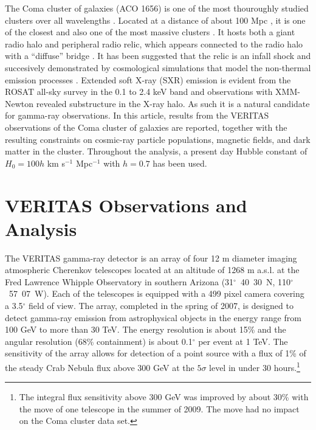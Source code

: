 \documentclass[12pt,manuscript]{aastex}
\begin{document}
The Coma cluster of galaxies (ACO 1656) is one of the most thouroughly studied clusters over all wavelengths \citep{article:Voges_etal:1999}. Located at a distance of about 100 Mpc \citep[$z=0.023$;][]{article:StrubleRood:1999}, it is one of the closest and also one of the most massive clusters \citep[$M \sim 10^{15}M_{\odot}$;][]{article:Smith:1983, article:Kubo_etal:2008}. It hosts both a giant radio halo \citep{article:Giovannini_etal:1993,article:Thierbach_etal:2003} and peripheral radio relic, which appears connected to the radio halo with a ``diffuse'' bridge \citep[see discussion in][]{article:BrownRudnick:2010}. It has been suggested that the relic is an infall shock \citep{article:Ensslin_etal:1998} and succesively demonstrated by cosmological simulations that model the non-thermal emission processes \citep{article:PfrommerEnsslinSpringel:2008, article:Pfrommer:2008, article:Battaglia_etal:2009, article:Skillman_etal:2011}. Extended soft X-ray (SXR) emission is evident from the ROSAT all-sky survey in the 0.1 to 2.4 keV band \citep{article:BrielHenryBohringer:1992} and observations with XMM-Newton \citep{article:Briel_etal:2001} revealed substructure in the X-ray halo. As such it is a natural candidate for gamma-ray observations. In this article, results from the VERITAS observations of the Coma cluster of galaxies are reported, together with the resulting constraints on cosmic-ray particle populations, magnetic fields, and dark matter in the cluster. Throughout the analysis, a present day Hubble constant of $H_{0} = 100h$ km s$^{-1}$ Mpc$^{-1}$ with $h=0.7$ has been used.

\section{VERITAS Observations and Analysis}
The VERITAS gamma-ray detector \citep{article:Weekes_etal:2002} is an array of four 12 m diameter imaging atmospheric Cherenkov telescopes \citep[IACTs;][]{article:Holder_etal:2006} located at an altitude of 1268 m a.s.l. at the Fred Lawrence Whipple Observatory in southern Arizona (31$^{\circ}$~40\arcmin~30\arcsec~N, 110$^{\circ}$~57\arcmin~07\arcsec~W). Each of the telescopes is equipped with a 499 pixel camera covering a 3.5$^{\circ}$ field of view. The array, completed in the spring of 2007, is designed to detect gamma-ray emission from astrophysical objects in the energy range from 100 GeV to more than 30 TeV. The energy resolution is about 15\% and the angular resolution (68\% containment) is about 0.1$^{\circ}$ per event at 1 TeV. The sensitivity of the array allows for detection of a point source with a flux of 1\% of the steady Crab Nebula flux above 300 GeV at the $5\sigma$ level in under 30 hours.\footnote{The integral flux sensitivity above 300 GeV was improved by about 30\% with the move of one telescope in the summer of 2009. The move had no impact on the Coma cluster data set.}
\end{document}
